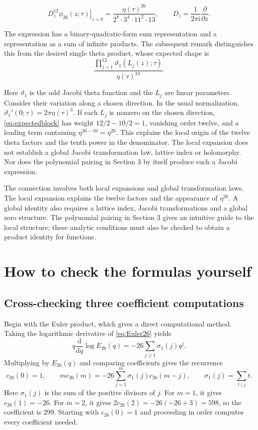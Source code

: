 \documentclass[a4paper,11pt]{article}
\theoremstyle{definition}
\newcommand{\iu}{\mathrm i}
\newcommand{\diff}{\mathrm d}
\begin{document}
\begin{equation}\label{eq:Wagner}
 \left.D_z^{12}\phi_{26}(z;\tau)\right|_{z=0}
 =\frac{\eta(\tau)^{26}}{2^8\cdot3^4\cdot11^2\cdot13},
 \qquad D_z=\frac{1}{2\pi\iu}\frac{\partial}{\partial z}.
\end{equation}

The expression has a binary-quadratic-form sum representation
and a representation as a sum of infinite products.
The subsequent remark distinguishes this from the desired single
theta product, whose expected shape is
\begin{equation}\label{eq:expectedblock}
 \frac{\prod_{j=1}^{12}\vartheta_1(L_j(z);\tau)}
      {\eta(\tau)^{10}}.
\end{equation}

Here \(\vartheta_1\) is the odd Jacobi theta function and the \(L_j\) are linear parameters.
Consider their variation along a chosen direction. In the usual normalization,
\(\vartheta_1'(0;\tau)=2\pi\eta(\tau)^3\).
If each \(L_j\) is nonzero on the chosen direction,
\eqref{eq:expectedblock} has weight \(12/2-10/2=1\),
vanishing order twelve, and a leading term containing
\(\eta^{36-10}=\eta^{26}\).
This explains the local origin of the twelve theta factors and
the tenth power in the denominator.
The local expansion does not establish a global Jacobi
transformation law, lattice index or holomorphy.
Nor does the polynomial pairing in Section 3 by itself produce
such a Jacobi expression.

The connection involves both local expansions and global transformation laws.
The local expansion explains the twelve factors and the appearance of \(\eta^{26}\).
A global identity also requires a lattice index, Jacobi transformations
and a global zero structure.
The polynomial pairing in Section 3 gives an intuitive guide to the local structure;
these analytic conditions must also be checked to obtain a product identity for functions.

\section{How to check the formulas yourself}
\subsection{Cross-checking three coefficient computations}
Begin with the Euler product, which gives a direct computational method.
Taking the logarithmic derivative of \eqref{eq:Euler26} yields
\[
 q\frac{\diff}{\diff q}\log E_{26}(q)
 =-26\sum_{j\geq1}\sigma_1(j)q^j.
\]
Multiplying by \(E_{26}(q)\) and comparing coefficients gives the recurrence
\begin{equation}\label{eq:coefficientrecursion}
 c_{26}(0)=1,\qquad
 m c_{26}(m)=-26\sum_{j=1}^m\sigma_1(j)c_{26}(m-j),
 \qquad \sigma_1(j)=\sum_{t\mid j}t.
\end{equation}
Here \(\sigma_1(j)\) is the sum of the positive divisors of \(j\).
For \(m=1\), it gives \(c_{26}(1)=-26\).
For \(m=2\), it gives \(2c_{26}(2)=-26(-26+3)=598\), so the coefficient is 299.
Starting with \(c_{26}(0)=1\) and proceeding in order computes every coefficient needed.
\end{document}
